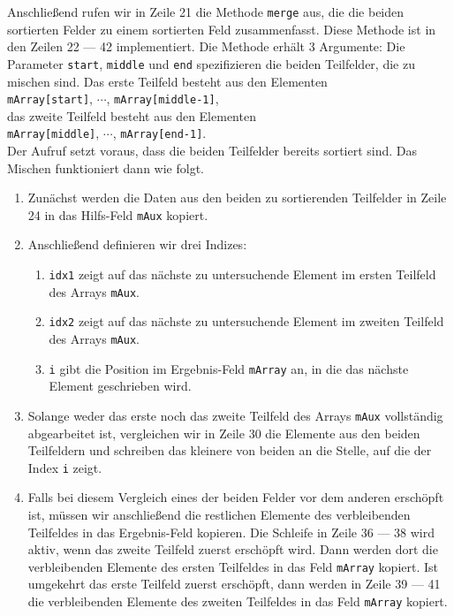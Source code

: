Anschlie\ss{}end rufen wir in Zeile 21 die Methode \texttt{merge} aus, die die beiden
sortierten Felder zu einem sortierten Feld zusammenfasst.  Diese Methode ist in den Zeilen
22 --- 42 implementiert.  Die Methode erh\"alt 3 Argumente: Die Parameter \texttt{start},
\texttt{middle} und \texttt{end} spezifizieren die beiden Teilfelder, die zu mischen sind.
Das erste Teilfeld besteht aus den Elementen \\[0.1cm]
\hspace*{1.3cm} \texttt{mArray[start]}, $\cdots$, \texttt{mArray[middle-1]}, \\[0.1cm]
das zweite Teilfeld besteht aus den Elementen \\[0.1cm]
\hspace*{1.3cm} \texttt{mArray[middle]}, $\cdots$, \texttt{mArray[end-1]}. \\[0.1cm]
Der Aufruf setzt voraus, dass die beiden Teilfelder bereits sortiert sind.
Das Mischen funktioniert dann wie folgt.
\begin{enumerate}
\item Zun\"achst werden die Daten aus den beiden zu sortierenden Teilfelder
      in Zeile 24 in das Hilfs-Feld \texttt{mAux} kopiert.
\item Anschlie\ss{}end definieren wir drei Indizes:
      \begin{enumerate}
      \item \texttt{idx1} zeigt auf das n\"achste zu untersuchende Element im ersten
            Teilfeld des Arrays \texttt{mAux}.
      \item \texttt{idx2} zeigt auf das n\"achste zu untersuchende Element im zweiten
            Teilfeld des Arrays \texttt{mAux}.
      \item \texttt{i} gibt die Position im Ergebnis-Feld \texttt{mArray} an, in die das
            n\"achste Element geschrieben wird.
      \end{enumerate}
\item Solange weder das erste noch das zweite Teilfeld des Arrays \texttt{mAux}
      vollst\"andig abgearbeitet ist, vergleichen wir in Zeile 30 die Elemente aus den beiden Teilfeldern
      und schreiben das kleinere von beiden an die Stelle, auf die der Index \texttt{i} zeigt.
\item Falls bei diesem Vergleich eines der beiden Felder vor dem anderen ersch\"opft ist,
      m\"ussen wir anschlie\ss{}end die restlichen Elemente des verbleibenden Teilfeldes
      in das Ergebnis-Feld kopieren.  Die Schleife in Zeile 36 --- 38 wird aktiv, wenn das
      zweite Teilfeld zuerst ersch\"opft wird.  Dann werden dort die verbleibenden Elemente
      des ersten Teilfeldes in das Feld \texttt{mArray} kopiert.  Ist umgekehrt das erste
      Teilfeld zuerst ersch\"opft, dann werden in Zeile 39 --- 41 die verbleibenden Elemente
      des zweiten Teilfeldes in das Feld \texttt{mArray} kopiert. 
\end{enumerate}
\pagebreak


